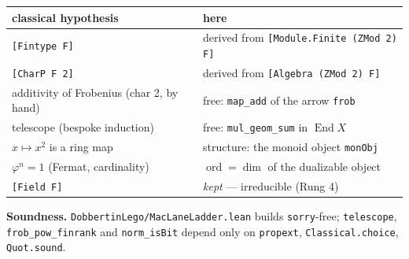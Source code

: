 \documentclass[11pt]{article}
\newcommand{\lc}[1]{\texttt{\small #1}}
\newcommand{\End}{\operatorname{End}}
\begin{document}
\begin{center}\small
\renewcommand{\arraystretch}{1.3}
\begin{tabular}{@{}p{7.4cm}p{7.2cm}@{}}
\hline
\textbf{classical hypothesis} & \textbf{here}\\
\hline
\lc{[Fintype F]} & \textcolor{r4}{derived} from \lc{[Module.Finite (ZMod 2) F]}\\
\lc{[CharP F 2]} & \textcolor{r4}{derived} from \lc{[Algebra (ZMod 2) F]}\\
additivity of Frobenius (char 2, by hand) & \textcolor{r2}{free}: \lc{map\_add} of the arrow \lc{frob}\\
telescope (bespoke induction) & \textcolor{r1}{free}: \lc{mul\_geom\_sum} in $\End X$\\
$x\mapsto x^{2}$ is a ring map & \textcolor{r3}{structure}: the monoid object \lc{monObj}\\
$\varphi^{n}=1$ (Fermat, cardinality) & \textcolor{r4}{$\operatorname{ord}=\dim$} of the dualizable object\\
\lc{[Field F]} & \emph{kept} --- irreducible (Rung 4)\\
\hline
\end{tabular}
\end{center}

\begin{note}
\textbf{Soundness.} \lc{DobbertinLego/MacLaneLadder.lean} builds \lc{sorry}-free;
\lc{telescope}, \lc{frob\_pow\_finrank} and \lc{norm\_isBit} depend only on
\lc{propext}, \lc{Classical.choice}, \lc{Quot.sound}.
\end{note}
\end{document}
